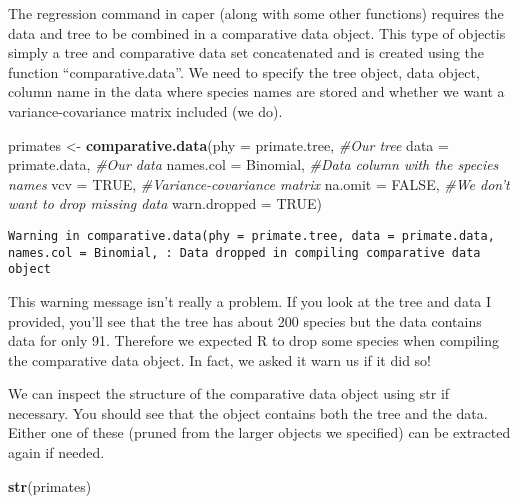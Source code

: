 \documentclass[]{book}
\newenvironment{Shaded}{\begin{snugshade}}{\end{snugshade}}
\newcommand{\KeywordTok}[1]{\textcolor[rgb]{0.13,0.29,0.53}{\textbf{#1}}}
\newcommand{\DataTypeTok}[1]{\textcolor[rgb]{0.13,0.29,0.53}{#1}}
\newcommand{\StringTok}[1]{\textcolor[rgb]{0.31,0.60,0.02}{#1}}
\newcommand{\CommentTok}[1]{\textcolor[rgb]{0.56,0.35,0.01}{\textit{#1}}}
\newcommand{\OtherTok}[1]{\textcolor[rgb]{0.56,0.35,0.01}{#1}}
\newcommand{\NormalTok}[1]{#1}
\begin{document}
The regression command in caper (along with some other functions)
requires the data and tree to be combined in a comparative data object.
This type of objectis simply a tree and comparative data set
concatenated and is created using the function ``comparative.data''. We
need to specify the tree object, data object, column name in the data
where species names are stored and whether we want a variance-covariance
matrix included (we do).

\begin{Shaded}
\begin{Highlighting}[]
\NormalTok{primates <-}\StringTok{ }\KeywordTok{comparative.data}\NormalTok{(}\DataTypeTok{phy =}\NormalTok{ primate.tree,     }\CommentTok{#Our tree}
                             \DataTypeTok{data =}\NormalTok{ primate.data,    }\CommentTok{#Our data}
                             \DataTypeTok{names.col =}\NormalTok{ Binomial,   }\CommentTok{#Data column with the species names}
                             \DataTypeTok{vcv =} \OtherTok{TRUE}\NormalTok{,             }\CommentTok{#Variance-covariance matrix}
                             \DataTypeTok{na.omit =} \OtherTok{FALSE}\NormalTok{,        }\CommentTok{#We don't want to drop missing data}
                             \DataTypeTok{warn.dropped =} \OtherTok{TRUE}\NormalTok{)}
\end{Highlighting}
\end{Shaded}

\begin{verbatim}
Warning in comparative.data(phy = primate.tree, data = primate.data,
names.col = Binomial, : Data dropped in compiling comparative data object
\end{verbatim}

This warning message isn't really a problem. If you look at the tree and
data I provided, you'll see that the tree has about 200 species but the
data contains data for only 91. Therefore we expected R to drop some
species when compiling the comparative data object. In fact, we asked it
warn us if it did so!

We can inspect the structure of the comparative data object using str if
necessary. You should see that the object contains both the tree and the
data. Either one of these (pruned from the larger objects we specified)
can be extracted again if needed.

\begin{Shaded}
\begin{Highlighting}[]
\KeywordTok{str}\NormalTok{(primates)}
\end{Highlighting}
\end{Shaded}
\end{document}
